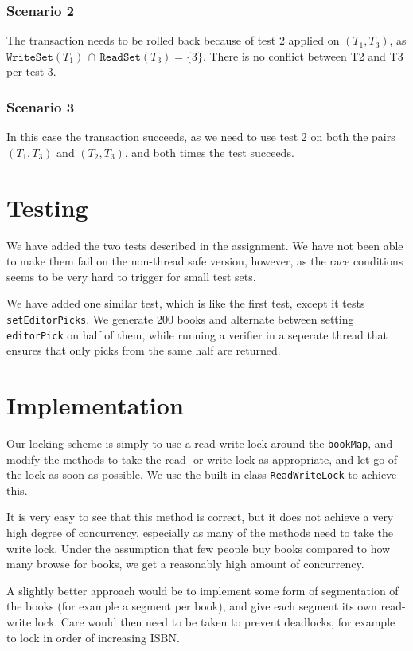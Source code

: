 \documentclass[11pt,a4paper]{article}
\begin{document}
\subsubsection{Scenario 2}
The transaction needs to be rolled back because of test 2 applied on
$(T_1,T_3)$, as $\mathtt{WriteSet}(T_1) \,\cap\, \mathtt{ReadSet}(T_3) =
\{3\}$. There is no conflict between T2 and T3 per test 3.

\subsubsection{Scenario 3}
In this case the transaction succeeds, as we need to use test 2 on both the
pairs $(T_1, T_3)$ and $(T_2, T_3)$, and both times the test succeeds.

\section{Testing}
We have added the two tests described in the assignment. We have not been able
to make them fail on the non-thread safe version, however, as the race
conditions seems to be very hard to trigger for small test sets.

We have added one similar test, which is like the first test, except it tests
\texttt{setEditorPicks}. We generate 200 books and alternate between setting
\texttt{editorPick} on half of them, while running a verifier in a seperate
thread that ensures that only picks from the same half are returned.

\section{Implementation}
Our locking scheme is simply to use a read-write lock around the
\texttt{bookMap}, and modify the methods to take the read- or write lock
as appropriate, and let go of the lock as soon as possible. We use the
built in class \texttt{ReadWriteLock} to achieve this. 

It is very easy to see that this method is correct, but it does not achieve a
very high degree of concurrency, especially as many of the methods need to take
the write lock. Under the assumption that few people buy books compared to how
many browse for books, we get a reasonably high amount of concurrency.

\label{lol}
A slightly better approach would be to implement some form
of segmentation of the books (for example a segment per book), and give each
segment its own read-write lock. Care would then need to be taken to prevent
deadlocks, for example to lock in order of increasing ISBN.
\end{document}
